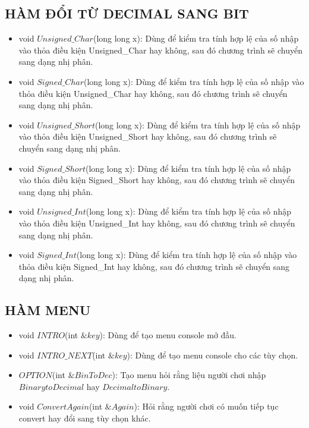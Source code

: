 \documentclass[12pt,a4paper]{article}
\begin{document}
\Large \subsection{\color{blue}\textbf{HÀM ĐỔI TỪ DECIMAL SANG BIT} }
\begin{itemize}
    \item void $Unsigned\_Char$(long long x): Dùng để kiểm tra tính hợp lệ của số nhập vào thỏa điều kiện Unsigned\_Char hay không, sau đó chương trình sẽ chuyển sang dạng nhị phân. \\
    \item void $Signed\_Char$(long long x): Dùng để kiểm tra tính hợp lệ của số nhập vào thỏa điều kiện Unsigned\_Char hay không, sau đó chương trình sẽ chuyển sang dạng nhị phân. \\
    \item void $Unsigned\_Short$(long long x): Dùng để kiểm tra tính hợp lệ của số nhập vào thỏa điều kiện Unsigned\_Short hay không, sau đó chương trình sẽ chuyển sang dạng nhị phân.\\
    \item void $Signed\_Short$(long long x): Dùng để kiểm tra tính hợp lệ của số nhập vào thỏa điều kiện Signed\_Short hay không, sau đó chương trình sẽ chuyển sang dạng nhị phân.\\
    \item void $Unsigned\_Int$(long long x): Dùng để kiểm tra tính hợp lệ của số nhập vào thỏa điều kiện Unsigned\_Int hay không, sau đó chương trình sẽ chuyển sang dạng nhị phân.\\
    \item void $Signed\_Int$(long long x): Dùng để kiểm tra tính hợp lệ của số nhập vào thỏa điều kiện Signed\_Int hay không, sau đó chương trình sẽ chuyển sang dạng nhị phân.\\
\end{itemize}
\Large \subsection{\color{blue}\textbf{HÀM MENU} }
\begin{itemize}
    \item void $INTRO$(int $\&key$): Dùng để tạo menu console mở đầu. \\
    \item void $INTRO\_NEXT$(int $\&key$): Dùng để tạo menu console cho các tùy chọn.\\
    \item $OPTION$(int $\&BinToDec$): Tạo menu hỏi rằng liệu người chơi nhập $Binary to Decimal$ hay $Decimal to Binary$.\\
    \item void $ConvertAgain$(int $\&Again$): Hỏi rằng người chơi có muốn tiếp tục convert hay đổi sang tùy chọn khác.\\
\end{itemize}
\end{document}
